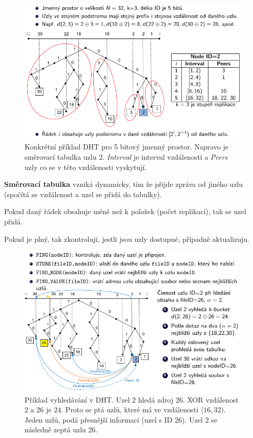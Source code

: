 \begin{figure}[htb!]
    \centering
    \includegraphics[width=1\linewidth]{dht_2.pdf}
    \caption{Konkrétní příklad DHT pro 5 bitový jmenný prostor. Napravo je směrovací tabulka uzlu 2. \textit{Interval} je interval vzdáleností a \textit{Peers} uzly co se v této vzdálenosti vyskytují.}
\end{figure}

\begin{compactitem}
    \item \textbf{Směrovací tabulka} vzniká dynamicky, tím že přijde zpráva od jiného uzlu (spočítá se vzdálenost a uzel se přidá do tabulky). \begin{compactitem}
        \item Pokud daný řádek obsahuje méně než k položek (počet replikací), tak se uzel přidá.
        \item Pokud je plný, tak zkontroluji, jestli jsou uzly dostupné, případně aktualizuju.
    \end{compactitem}
\end{compactitem}

\begin{figure}[htb!]
    \centering
    \includegraphics[width=1\linewidth]{dht_3.pdf}
    \caption{Příklad vyhledávání v DHT. Uzel $2$ hledá zdroj $26$. XOR vzdálenost $2$ a $26$ je $24$. Proto se ptá uzlů, které má ve vzdálenosti $\langle 16,32 )$. Jeden uzlů, podá přesnější informaci (uzel s ID 26). Uzel 2 se následně zeptá uzlu 26.}
\end{figure}

